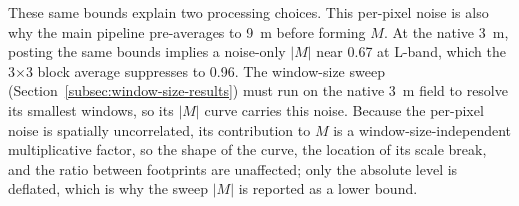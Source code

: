 \documentclass[journal abbreviation, manuscript]{copernicus}
\begin{document}
These same bounds explain two processing choices. This per-pixel noise is also why the main pipeline pre-averages to 9~m before forming $M$. At the native 3~m, posting the same bounds implies a noise-only $|M|$ near 0.67 at L-band, which the 3$\times$3 block average suppresses to 0.96. The window-size sweep (Section~\ref{subsec:window-size-results}) must run on the native 3~m field to resolve its smallest windows, so its $|M|$ curve carries this noise. Because the per-pixel noise is spatially uncorrelated, its contribution to $M$ is a window-size-independent multiplicative factor, so the shape of the curve, the location of its scale break, and the ratio between footprints are unaffected; only the absolute level is deflated, which is why the sweep $|M|$ is reported as a lower bound.

\noappendix       %









\end{document}
